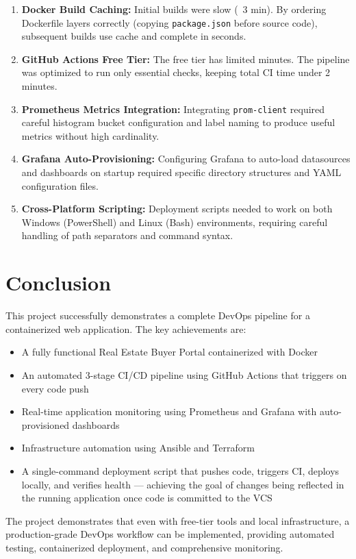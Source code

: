 \documentclass[12pt,a4paper]{article}
\begin{document}
\begin{enumerate}
    \item \textbf{Docker Build Caching:} Initial builds were slow (~3 min). By ordering Dockerfile layers correctly (copying \texttt{package.json} before source code), subsequent builds use cache and complete in seconds.
    
    \item \textbf{GitHub Actions Free Tier:} The free tier has limited minutes. The pipeline was optimized to run only essential checks, keeping total CI time under 2 minutes.
    
    \item \textbf{Prometheus Metrics Integration:} Integrating \texttt{prom-client} required careful histogram bucket configuration and label naming to produce useful metrics without high cardinality.
    
    \item \textbf{Grafana Auto-Provisioning:} Configuring Grafana to auto-load datasources and dashboards on startup required specific directory structures and YAML configuration files.
    
    \item \textbf{Cross-Platform Scripting:} Deployment scripts needed to work on both Windows (PowerShell) and Linux (Bash) environments, requiring careful handling of path separators and command syntax.
\end{enumerate}

\section{Conclusion}

This project successfully demonstrates a complete DevOps pipeline for a containerized web application. The key achievements are:

\begin{itemize}
    \item A fully functional Real Estate Buyer Portal containerized with Docker
    \item An automated 3-stage CI/CD pipeline using GitHub Actions that triggers on every code push
    \item Real-time application monitoring using Prometheus and Grafana with auto-provisioned dashboards
    \item Infrastructure automation using Ansible and Terraform
    \item A single-command deployment script that pushes code, triggers CI, deploys locally, and verifies health --- achieving the goal of changes being reflected in the running application once code is committed to the VCS
\end{itemize}

The project demonstrates that even with free-tier tools and local infrastructure, a production-grade DevOps workflow can be implemented, providing automated testing, containerized deployment, and comprehensive monitoring.
\end{document}
